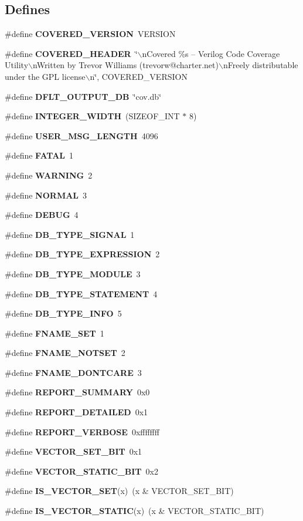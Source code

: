 \subsection*{Defines}
\begin{CompactItemize}
\item 
\#define {\bf COVERED\_\-VERSION}\ VERSION
\item 
\#define {\bf COVERED\_\-HEADER}\ \char`\"{}$\backslash$n\-Covered \%s -- Verilog Code Coverage Utility$\backslash$n\-Written by Trevor Williams  (trevorw@charter.net)$\backslash$n\-Freely distributable under the GPL license$\backslash$n\char`\"{}, COVERED\_\-VERSION
\item 
\#define {\bf DFLT\_\-OUTPUT\_\-DB}\ \char`\"{}cov.db\char`\"{}
\item 
\#define {\bf INTEGER\_\-WIDTH}\ (SIZEOF\_\-INT $\ast$ 8)
\item 
\#define {\bf USER\_\-MSG\_\-LENGTH}\ 4096
\item 
\#define {\bf FATAL}\ 1
\item 
\#define {\bf WARNING}\ 2
\item 
\#define {\bf NORMAL}\ 3
\item 
\#define {\bf DEBUG}\ 4
\item 
\#define {\bf DB\_\-TYPE\_\-SIGNAL}\ 1
\item 
\#define {\bf DB\_\-TYPE\_\-EXPRESSION}\ 2
\item 
\#define {\bf DB\_\-TYPE\_\-MODULE}\ 3
\item 
\#define {\bf DB\_\-TYPE\_\-STATEMENT}\ 4
\item 
\#define {\bf DB\_\-TYPE\_\-INFO}\ 5
\item 
\#define {\bf FNAME\_\-SET}\ 1
\item 
\#define {\bf FNAME\_\-NOTSET}\ 2
\item 
\#define {\bf FNAME\_\-DONTCARE}\ 3
\item 
\#define {\bf REPORT\_\-SUMMARY}\ 0x0
\item 
\#define {\bf REPORT\_\-DETAILED}\ 0x1
\item 
\#define {\bf REPORT\_\-VERBOSE}\ 0xffffffff
\item 
\#define {\bf VECTOR\_\-SET\_\-BIT}\ 0x1
\item 
\#define {\bf VECTOR\_\-STATIC\_\-BIT}\ 0x2
\item 
\#define {\bf IS\_\-VECTOR\_\-SET}(x)\ (x \& VECTOR\_\-SET\_\-BIT)
\item 
\#define {\bf IS\_\-VECTOR\_\-STATIC}(x)\ (x \& VECTOR\_\-STATIC\_\-BIT)
\item 

\end{CompactItemize}
